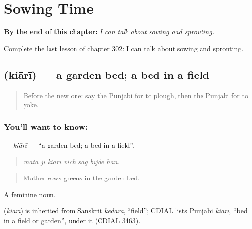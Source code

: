 
\chapter{Sowing Time}
\label{ch:pa-a2-sowing-time}

\begin{chapteropening}
\textbf{By the end of this chapter:} \emph{I can talk about sowing and sprouting.}

Complete the last lesson of chapter 302: I can talk about sowing and sprouting.
\end{chapteropening}

\section[\texorpdfstring{\pa{ਕਿਆਰੀ} (kiārī)}{ਕਿਆਰੀ (kiārī)}]{ (kiārī) — a garden bed; a bed in a field}

\label{lesson:PA-C302-kiari}



\begin{quote}
Before the new one: say the Punjabi for to plough, then the Punjabi for to yoke.
\end{quote}

\subsection*{You'll want to know: }
\textbf{} — \emph{kiārī} — \textquotedblleft{}a garden bed; a bed in a field\textquotedblright{}.

\begin{quote}
      
\end{quote}

\begin{quote}
\emph{mātā jī kiārī vich sāg bījde han.}
\end{quote}

\begin{quote}
Mother sows greens in the garden bed.
\end{quote}

A feminine noun.

\begin{cousinweb}
\textbf{} (\emph{kiārī}) is inherited from Sanskrit \emph{kēdāra}, \textquotedblleft{}field\textquotedblright{}; CDIAL lists Punjabi \emph{kiārī}, \textquotedblleft{}bed in a field or garden\textquotedblright{}, under it (CDIAL 3463).
\end{cousinweb}

